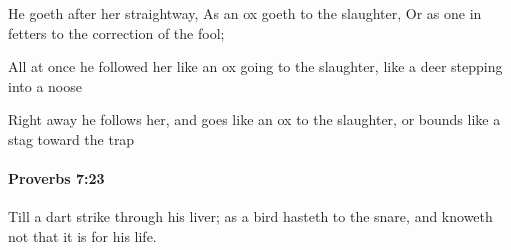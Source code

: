 			\begin{versebox}
					\item[BHS] 
					\item[ASV] He goeth after her straightway, As an ox goeth to the slaughter, Or as one in fetters to the correction of the fool;
					\item[NIV] All at once he followed her like an ox going to the slaughter, like a deer stepping into a noose
					\item[NRSV] Right away he follows her, and goes like an ox to the slaughter, or bounds like a stag toward the trap
			\end{versebox}

		\paragraph{Proverbs 7:23} %
			\label{PROVERBS-7-23}

			Till a dart strike through his liver; as a bird hasteth to the snare, and knoweth not that it is for his life.

